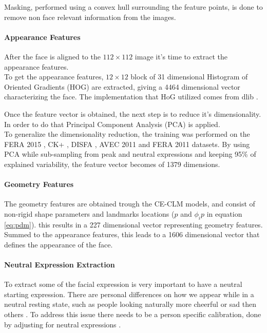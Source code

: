 Masking, performed using a convex hull surrounding the feature points, is done to remove non face relevant information from the images.

\paragraph{Appearance Features}
After the face is aligned to the $112 \times 112$ image it's time to extract the appearance features. \\
To get the appearance features, $12 \times 12$ block of 31 dimensional Histogram of Oriented Gradients (HOG) are extracted, giving a 4464 dimensional vector characterizing the face. The implementation that HoG utilized comes from dlib \cite{dlib}.

Once the feature vector is obtained, the next step is to reduce it's dimensionality. In order to do that Principal Component Analysis (PCA) is applied. \\
To generalize the dimensionality reduction, the training was performed on the FERA 2015 \cite{FERA15}, CK+ \cite{CK+}, DISFA \cite{DISFA}, AVEC 2011 \cite{AVEC11} and FERA 2011 \cite{FERA11} datasets. By using PCA while sub-sampling from peak and neutral expressions and keeping 95\% of explained variability, the feature vector becomes of 1379 dimensions.

\paragraph{Geometry Features}
The geometry features are obtained trough the CE-CLM models, and consist of non-rigid shape parameters and landmarks locations ($p$ and $ \phi_i p$ in equation \ref{eq:pdm}). this results in a 227 dimensional vector representing geometry features.\\
Summed to the appearance features, this leads to a 1606 dimensional vector that defines the appearance of the face.

\paragraph{Neutral Expression Extraction}
To extract some of the facial expression is very important to have a neutral starting expression. There are personal differences on how we appear while in a neutral resting state, such as people looking naturally more cheerful or sad then others \cite{normexpr}. To address this issue there needs to be a person specific calibration, done by adjusting for neutral expressions \cite{Baltru2013}.

